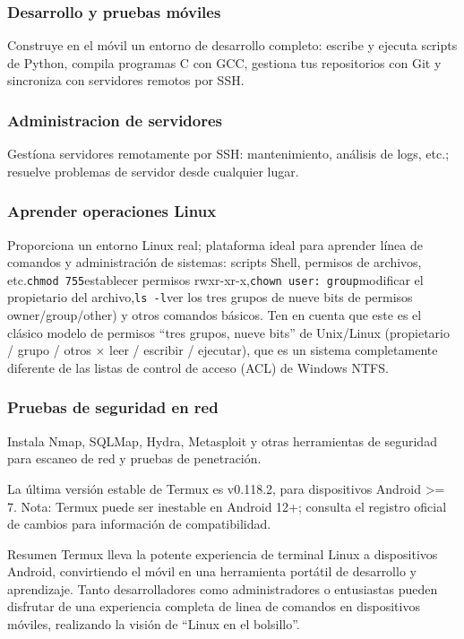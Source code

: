 \subsubsection*{Desarrollo y pruebas móviles}

Construye en el móvil un entorno de desarrollo completo: escribe y ejecuta scripts de Python, compila programas C con GCC, gestiona tus repositorios con Git y sincroniza con servidores remotos por SSH.

\subsubsection*{Administracion de servidores}

Gestíona servidores remotamente por SSH: mantenimiento, análisis de logs, etc.; resuelve problemas de servidor desde cualquier lugar.

\subsubsection*{Aprender operaciones Linux}

Proporciona un entorno Linux real; plataforma ideal para aprender línea de comandos y administración de sistemas: scripts Shell, permisos de archivos, etc.\texttt{chmod 755}establecer permisos rwxr-xr-x,\texttt{chown user: group}modificar el propietario del archivo,\texttt{ls -\allowbreak l}ver los tres grupos de nueve bits de permisos owner/group/other) y otros comandos básicos. Ten en cuenta que este es el clásico modelo de permisos “tres grupos, nueve bits” de Unix/Linux (propietario / grupo / otros × leer / escribir / ejecutar), que es un sistema completamente diferente de las listas de control de acceso (ACL) de Windows NTFS.

\subsubsection*{Pruebas de seguridad en red}

Instala Nmap, SQLMap, Hydra, Metasploit y otras herramientas de seguridad para escaneo de red y pruebas de penetración.


La última versión estable de Termux es v0.118.2, para dispositivos Android >= 7. Nota: Termux puede ser inestable en Android 12+; consulta el registro oficial de cambios para información de compatibilidad.

\begin{tcbinfo}{Resumen}
Termux lleva la potente experiencia de terminal Linux a dispositivos Android, convirtiendo el móvil en una herramienta portátil de desarrollo y aprendizaje. Tanto desarrolladores como administradores o entusiastas pueden disfrutar de una experiencia completa de linea de comandos en dispositivos móviles, realizando la visión de “Linux en el bolsillo”.

\end{tcbinfo}

